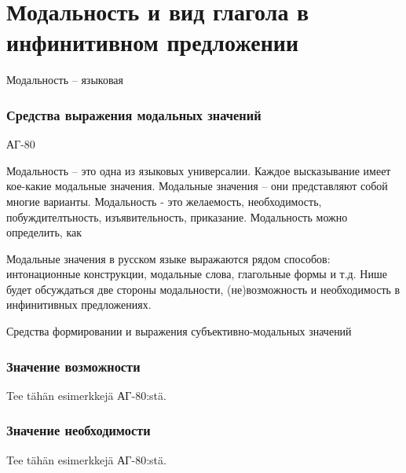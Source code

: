 \chapter{Модальность и вид глагола в инфинитивном предложении}

Модальность -- языковая 

\subsection{Средства выражения модальных значений}



АГ-80 

Модальность -- это одна из языковых универсалии. Каждое высказывание имеет кое-какие модальные значения. Модальные значения -- они представляют собой многие варианты. Модальность - это желаемость, необходимость, побуждителтьность, изъявительность, приказание. Модальность можно определить, как 

Модальные значения в русском языке выражаются рядом способов: интонационные конструкции, модальные слова, глагольные формы и т.д. Нише будет обсуждаться две стороны модальности, (не)возможность и необходимость в инфинитивных предложениях.

Средства формировании и выражения субъективно-модальных значений


\subsection{Значение возможности}

Tee tähän esimerkkejä АГ-80:stä.

\subsection{Значение необходимости}

Tee tähän esimerkkejä АГ-80:stä.
